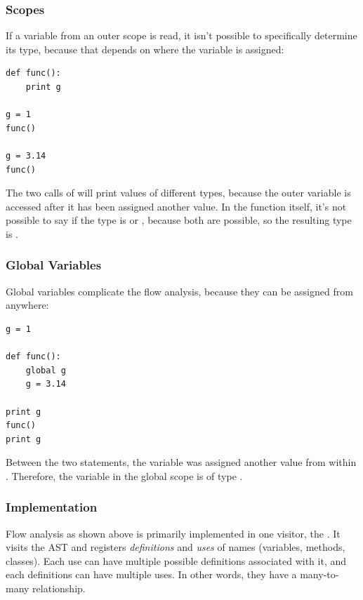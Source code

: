 \documentclass[12pt,halfparskip,DIV11,BCOR10mm]{scrreprt}
\begin{document}
\subsubsection{Scopes}

If a variable from an outer scope is read, it isn't possible to specifically determine its type, because that depends on where the variable is assigned:

\begin{lstlisting}
def func():
    print g

g = 1
func()

g = 3.14
func()
\end{lstlisting}

The two calls of  will print values of different types, because the outer variable  is accessed after it has been assigned another value. In the function itself, it's not possible to say if the type is  or , because both are possible, so the resulting type is .

\subsubsection{Global Variables}

Global variables complicate the flow analysis, because they can be assigned from anywhere:

\begin{lstlisting}
g = 1

def func():
    global g
    g = 3.14

print g
func()
print g
\end{lstlisting}

Between the two  statements, the variable  was assigned another value from within . Therefore, the variable  in the global scope is of type .

\subsubsection{Implementation}

Flow analysis as shown above is primarily implemented in one visitor, the . It visits the AST and registers \emph{definitions} and \emph{uses} of names (variables, methods, classes). Each use can have multiple possible definitions associated with it, and each definitions can have multiple uses. In other words, they have a many-to-many relationship.
\end{document}
